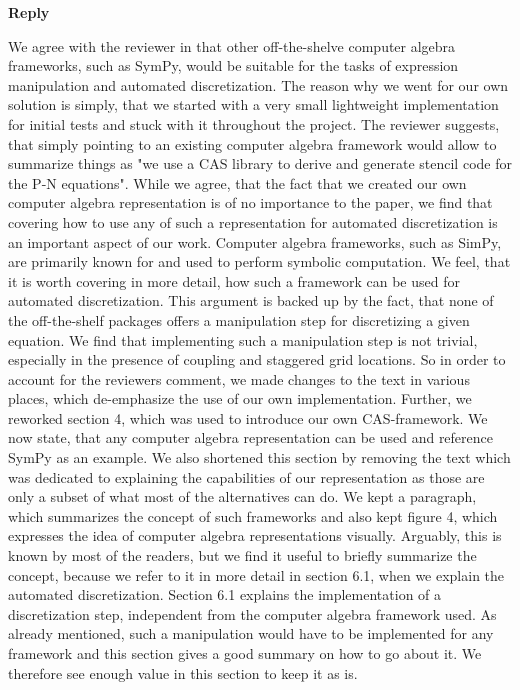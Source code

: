 \documentclass[11pt,letterpaper,headsepline,DIV15]{scrartcl}
\newcounter{rplcounter}
\renewcommand{\therplcounter}{\arabic{rplcounter}}
\newenvironment{reply}[2]{%
\refstepcounter{rplcounter}%
\label{#1}%
\noindent\textbf{\textcolor{answerColor}{Reply~\therplcounter}\\}%
\color{answerColor}
}%
{}%
\begin{document}
\begin{reply}{}{}
We agree with the reviewer in that other off-the-shelve computer algebra frameworks, such as SymPy, would be suitable for the tasks of expression manipulation and automated discretization. The reason why we went for our own solution is simply, that we started with a very small lightweight implementation for initial tests and stuck with it throughout the project.
\newline
\newline
The reviewer suggests, that simply pointing to an existing computer algebra framework would allow to summarize things as "we use a CAS library to derive and generate stencil code for the P-N equations". While we agree, that the fact that we created our own computer algebra representation is of no importance to the paper, we find that covering how to use any of such a representation for automated discretization is an important aspect of our work. Computer algebra frameworks, such as SimPy, are primarily known for and used to perform symbolic computation. We feel, that it is worth covering in more detail, how such a framework can be used for automated discretization. This argument is backed up by the fact, that none of the off-the-shelf packages offers a manipulation step for discretizing a given equation. We find that implementing such a manipulation step is not trivial, especially in the presence of coupling and staggered grid locations.
\newline
\newline
So in order to account for the reviewers comment, we made changes to the text in various places, which de-emphasize the use of our own implementation.
Further, we reworked section 4, which was used to introduce our own CAS-framework. We now state, that any computer algebra representation can be used and reference SymPy as an example. We also shortened this section by removing the text which was dedicated to explaining the capabilities of our representation as those are only a subset of what most of the alternatives can do. We kept a paragraph, which summarizes the concept of such frameworks and also kept figure 4, which expresses the idea of computer algebra representations visually. Arguably, this is known by most of the readers, but we find it useful to briefly summarize the concept, because we refer to it in more detail in section 6.1, when we explain the automated discretization.
\newline
\newline
Section 6.1 explains the implementation of a discretization step, independent from the computer algebra framework used. As already mentioned, such a manipulation would have to be implemented for any framework and this section gives a good summary on how to go about it. We therefore see enough value in this section to keep it as is.
\end{reply}
\end{document}
